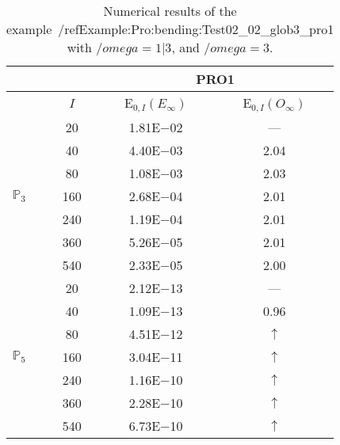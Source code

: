 \begin{table}[H]
\caption{Numerical results of the example~/ref{Example:Pro:bending:Test02_02_glob3_pro1} with $/omega=1|3$, and $/omega=3$.}
\setlength{\tabcolsep}{5pt}
\centering
\begin{tabular}{@{}l c c c@{}}
\toprule
 &  & \multicolumn{2}{c}{PRO1}\\
\midrule
 & $I$ & E$_{0,I}(E_{\infty})$ & E$_{0,I}(O_{\infty})$\\
\midrule
\multirow{7}{*}{$\mathbb{P}_{3}$}
 & 20 & 1.81E$-$02 & ---\\
 & 40 & 4.40E$-$03 & 2.04\\
 & 80 & 1.08E$-$03 & 2.03\\
 & 160 & 2.68E$-$04 & 2.01\\
 & 240 & 1.19E$-$04 & 2.01\\
 & 360 & 5.26E$-$05 & 2.01\\
 & 540 & 2.33E$-$05 & 2.00\\
\midrule
\multirow{7}{*}{$\mathbb{P}_{5}$}
 & 20 & 2.12E$-$13 & ---\\
 & 40 & 1.09E$-$13 & 0.96\\
 & 80 & 4.51E$-$12 & $\uparrow$\\
 & 160 & 3.04E$-$11 & $\uparrow$\\
 & 240 & 1.16E$-$10 & $\uparrow$\\
 & 360 & 2.28E$-$10 & $\uparrow$\\
 & 540 & 6.73E$-$10 & $\uparrow$\\
\bottomrule
\end{tabular}
\label{Table:PRO:test_02_02_test11_pro1}
\end{table}
